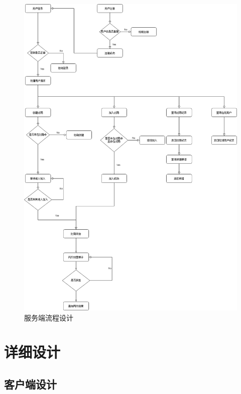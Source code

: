 \documentclass[utf8]{article}
\begin{document}
\begin{figure}[H]
    \centering
    \includegraphics[width=\textwidth]{pictures/3}
    \caption{服务端流程设计}
\end{figure}
\section{详细设计}
\subsection{客户端设计}
\end{document}
